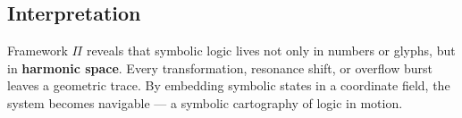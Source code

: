 \subsection*{Interpretation}

Framework $\Pi$ reveals that symbolic logic lives not only in numbers or glyphs, but in \textbf{harmonic space}. Every transformation, resonance shift, or overflow burst leaves a geometric trace. By embedding symbolic states in a coordinate field, the system becomes navigable — a symbolic cartography of logic in motion.

